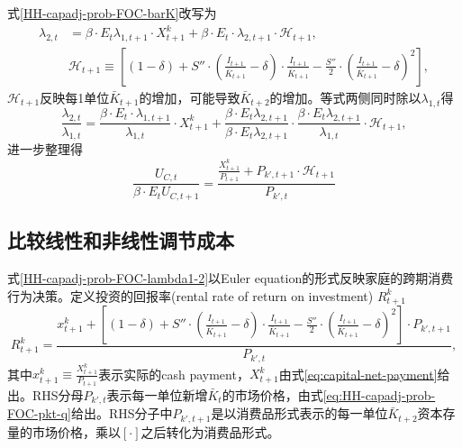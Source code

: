 式\eqref{HH-capadj-prob-FOC-barK}改写为
\begin{align*}
\lambda_{2,t} &= \beta \cdot E_t \lambda_{1,t+1} \cdot X^k_{t+1} + \beta \cdot E_t \cdot \lambda_{2,t+1 }\cdot \mathcal{H}_{t+1}, \nonumber \\
&\mathcal{H}_{t+1}\equiv \left[
(1-\delta) +S'' \cdot \left(\frac{I_{t+1}}{\bar{K}_{t+1}} - \delta\right) \cdot \frac{I_{t+1}}{\bar{K}_{t+1}}-\frac{S''}{2} \cdot \left(
\frac{I_{t+1}}{\bar{K}_{t+1}} - \delta
\right)^2
\right],
\end{align*}
$\mathcal{H}_{t+1}$反映每1单位$\bar{K}_{t+1}$的增加，可能导致$\bar{K}_{t+2}$的增加。等式两侧同时除以$\lambda_{1,t}$得
\begin{equation*}
\frac{\lambda_{2,t}}{\lambda_{1,t}} = \frac{\beta \cdot E_t \cdot \lambda_{1,t+1}}{\lambda_{1,t}}\cdot X^k_{t+1} +\frac{\beta \cdot E_{t} \lambda_{2,t+1}}{\beta \cdot E_{t} \lambda_{2,t+1}} \cdot \frac{\beta \cdot E_{t} \lambda_{2,t+1}}{\lambda_{1,t}} \cdot \mathcal{H}_{t+1},
\end{equation*}
进一步整理得
\begin{equation}
\label{HH-capadj-prob-FOC-lambda1-2}
\frac{U_{C,t}}{\beta \cdot E_t U_{C,t+1}} = \frac{\frac{X^k_{t+1}}{P_{t+1}} + P_{k',t+1} \cdot %
\mathcal{H}_{t+1}
}{P_{k',t}}
\end{equation}

\subsection{比较线性和非线性调节成本}
\label{sec:adj-cost-comp-lin-nonlin}
式\eqref{HH-capadj-prob-FOC-lambda1-2}以Euler equation的形式反映家庭的跨期消费行为决策。定义投资的回报率(rental rate of return on investment) $R^k_{t+1}$
\begin{equation}
\label{eq:adj-cost-return-investment}
R^k_{t+1} = \frac{x^k_{t+1} + \left[
(1-\delta) + S''\cdot \left(\frac{I_{t+1}}{\bar{K}_{t+1}} - \delta \right) \cdot \frac{I_{t+1}}{\bar{K}_{t+1}} - \frac{S''}{2} \cdot \left(\frac{I_{t+1}}{\bar{K}_{t+1}} - \delta \right)^2
\right] \cdot P_{k',t+1}}{P_{k',t}},
\end{equation}
其中$x^k_{t+1} \equiv \frac{X^k_{t+1}}{P_{t+1}}$表示实际的cash payment，$X^k_{t+1}$由式\eqref{eq:capital-net-payment}给出。RHS分母$P_{k',t}$表示每一单位新增$\bar{K}_t$的市场价格，由式\eqref{eq:HH-capadj-prob-FOC-pkt-q}给出。RHS分子中$P_{k',t+1}$是以消费品形式表示的每一单位$\bar{K}_{t+2}$资本存量的市场价格，乘以$[\cdot]$之后转化为消费品形式。

